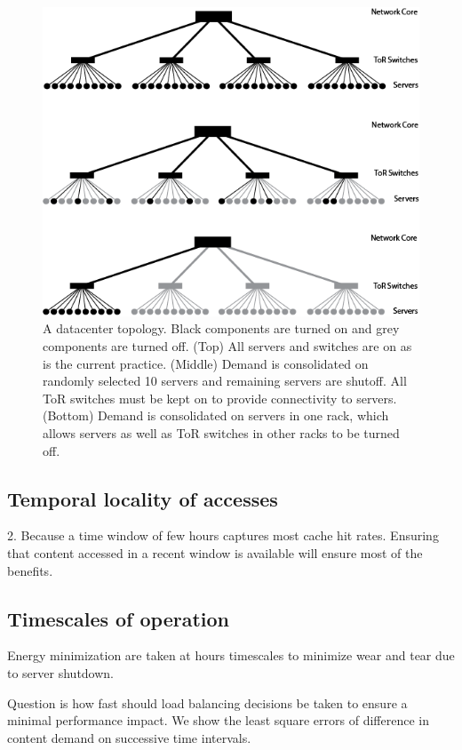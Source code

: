 \begin{figure}
\centering
\includegraphics[scale=0.4]{energy/dcTopology.png}
\caption{A datacenter topology. Black components are turned on and grey components are turned off. (Top) All servers and switches are on as is the current practice. (Middle) Demand is consolidated on randomly selected 10 servers and remaining servers are shutoff. All ToR switches must be kept on to provide connectivity to servers. (Bottom) Demand is consolidated on servers in one rack, which allows  servers as well as ToR switches in other racks to be turned off.}
\end{figure}

\subsection{Temporal locality of accesses}
\label{sec:templocality}
2. Because a time window of few hours captures most cache hit rates. Ensuring that content accessed in a recent window is available will ensure most of the benefits.

\subsection{Timescales of operation}
\label{sec:updatefrequency}

Energy minimization are taken at hours timescales to minimize wear and tear due to server shutdown.

Question is how fast should load balancing decisions be taken to ensure a minimal performance impact. We show the  least square errors of difference in content demand on successive time intervals.


